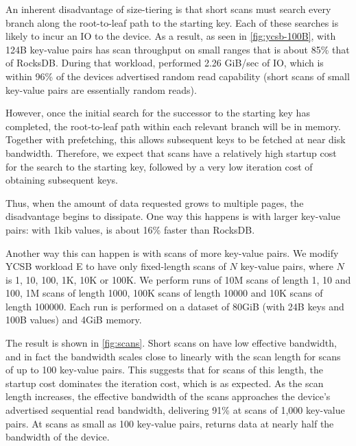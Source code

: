 An inherent disadvantage of size-tiering is that short scans must search every
branch along the root-to-leaf path to the starting key. Each of these searches
is likely to incur an IO to the device. As a result, as seen in
\cref{fig:ycsb-100B}, \sysname{} with 124B key-value pairs has scan throughput
on small ranges that is about 85\% that of RocksDB. During that workload,
\sysname performed 2.26 GiB/sec of IO, which is within 96\% of the devices
advertised random read capability (short scans of small key-value pairs are
essentially random reads).

However, once the initial search for the successor to the starting key has
completed, the root-to-leaf path within each relevant branch will be in memory.
Together with prefetching, this allows subsequent keys to be fetched at near
disk bandwidth. Therefore, we expect that scans have a relatively high startup
cost for the search to the starting key, followed by a very low iteration cost
of obtaining subsequent keys.

Thus, when the amount of data requested grows to multiple pages, the
disadvantage begins to dissipate. One way this happens is with larger key-value
pairs: with 1kib values, \sysname is about 16\% faster than RocksDB.

Another way this can happen is with scans of more key-value pairs.  We modify
YCSB workload E to have only fixed-length scans of $N$ key-value pairs, where
$N$ is 1, 10, 100, 1K, 10K or 100K.  We perform runs of 10M scans of length 1,
10 and 100, 1M scans of length 1000, 100K scans of length 10000 and 10K scans
of length 100000. Each run is performed on a dataset of 80GiB (with 24B keys and
100B values) and 4GiB memory.

The result is shown in \cref{fig:scans}. Short scans on \sysname have low
effective bandwidth, and in fact the bandwidth scales close to linearly with
the scan length for scans of up to 100 key-value pairs. This suggests that for
scans of this length, the startup cost dominates the iteration cost, which is
as expected.  As the scan length increases, the effective bandwidth of the
scans approaches the device's advertised sequential read bandwidth, delivering
91\% at scans of 1,000 key-value pairs.  At scans as small as 100 key-value
pairs, \sysname{} returns data at nearly half the bandwidth of the device.


